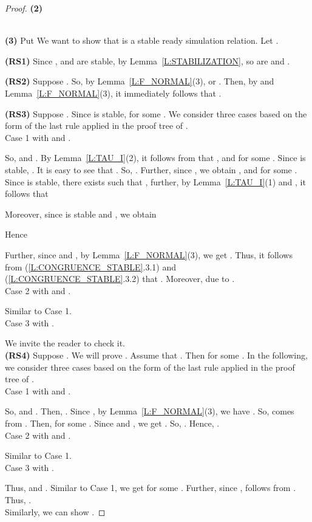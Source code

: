 \documentclass{elsarticle}
\theoremstyle{plain}
\theoremstyle{definition}
\begin{document}
\begin{proof}
\noindent \textbf{(2)}
    

    

    \\

\noindent \textbf{(3)}
        Put 
We want to show that  is a stable ready simulation relation. Let .

\textbf{(RS1)} Since ,  and  are stable, by Lemma~\ref{L:STABILIZATION}, so are  and .

\textbf{(RS2)} Suppose .
    So, by Lemma~\ref{L:F_NORMAL}(3),  or .
    Then, by   and Lemma~\ref{L:F_NORMAL}(3), it immediately follows that .

\textbf{(RS3)} Suppose .
    Since  is stable,  for some .
    We consider three cases based on the form of the last rule applied in the proof tree of .\\

 \noindent   Case 1  with  and .

    So,  and .
    By Lemma~\ref{L:TAU_I}(2), it follows from  that     ,  and  for some .
    Since  is stable,  .
    It is easy to see that .
    So, .
    Further, since , we obtain ,    and  for some .
    Since  is stable, there exists  such that ,
    further, by Lemma~\ref{L:TAU_I}(1) and , it follows that
    
    Moreover, since  is stable and , we obtain
    
    Hence
    
    Further, since  and , by Lemma~\ref{L:F_NORMAL}(3), we get .
    Thus, it follows from (\ref{L:CONGRUENCE_STABLE}.3.1) and (\ref{L:CONGRUENCE_STABLE}.3.2) that
    .
    Moreover,  due to .\\

\noindent Case 2  with  and .

 Similar to Case 1.\\

\noindent Case 3  with .

We invite the reader to check it.\\

\textbf{(RS4)}  Suppose .
    We will prove .
    Assume that . Then  for some . In the following, we consider three cases based on the form of the last rule applied in the proof tree of  .\\

\noindent    Case 1  with  and .

    So,  and . Then, .
    Since , by Lemma~\ref{L:F_NORMAL}(3), we have .
    So,  comes from .
    Then,  for some .
    Since  and , we get .
    So, .
    Hence, .\\

\noindent    Case 2  with  and .

Similar to Case 1.\\

\noindent    Case 3  with .

    Thus,  and .
    Similar to Case 1, we get  for some .
    Further, since ,  follows from . Thus, .\\

    Similarly, we can show .
\end{proof}
\end{document}
